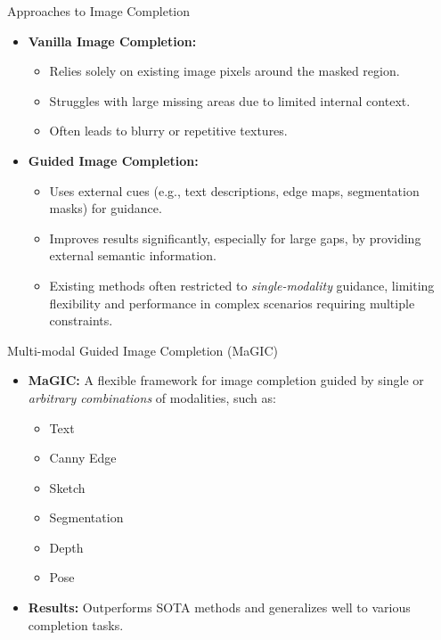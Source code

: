\documentclass[pdf]{beamer}
\begin{document}
\begin{frame}{Approaches to Image Completion}
    \begin{itemize}
        \item \textbf{Vanilla Image Completion:}
        \begin{itemize}
            \item Relies solely on existing image pixels around the masked region.
            \item Struggles with large missing areas due to limited internal context.
            \item Often leads to blurry or repetitive textures.
        \end{itemize}
        \item \textbf{Guided Image Completion:}
        \begin{itemize}
            \item Uses external cues (e.g., text descriptions, edge maps, segmentation masks) for guidance.
            \item Improves results significantly, especially for large gaps, by providing external semantic information.
            \item Existing methods often restricted to \textit{single-modality} guidance, limiting flexibility and performance in complex scenarios requiring multiple constraints.
        \end{itemize}
    \end{itemize}
\end{frame}

\begin{frame}{Multi-modal Guided Image Completion (MaGIC)}
    \begin{itemize}
        \item \textbf{MaGIC:} A flexible framework for image completion guided by single or \textit{arbitrary combinations} of modalities, such as:
        \begin{itemize}
            \item Text
            \item Canny Edge
            \item Sketch
            \item Segmentation
            \item Depth
            \item Pose
        \end{itemize}
        \item \textbf{Results:} Outperforms SOTA methods and generalizes well to various completion tasks.
    \end{itemize}
\end{frame}
\end{document}
